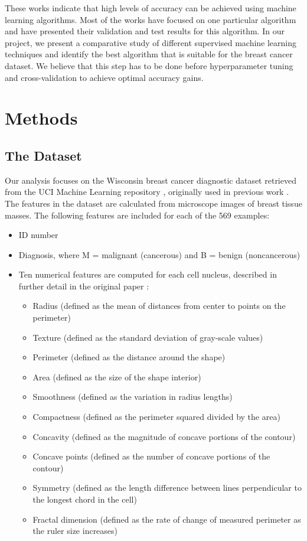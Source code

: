 \documentclass{article}
\begin{document}
These works indicate that high levels of accuracy can be achieved using machine learning algorithms. Most of the works have focused on one particular algorithm and have presented their validation and test results for this algorithm. In our project, we present a comparative study of different supervised machine learning techniques and identify the best algorithm that is suitable for the breast cancer dataset. We believe that this step has to be done before hyperparameter tuning and cross-validation to achieve optimal accuracy gains.

\section{Methods}

\subsection{The Dataset}

Our analysis focuses on the Wisconsin breast cancer diagnostic dataset retrieved from the UCI Machine Learning repository \cite{uci2017}, originally used in previous work \cite{tumour:1993}. The features in the dataset are calculated from microscope images of breast tissue masses. The following features are included for each of the 569 examples:

\begin{itemize}
\item ID number
\item Diagnosis, where M = malignant (cancerous) and B = benign (noncancerous)
\item Ten numerical features are computed for each cell nucleus, described in further detail in the original paper \cite{tumour:1993}:

\begin{itemize}
	\item Radius (defined as the mean of distances from center to points on the perimeter)
	\item Texture (defined as the standard deviation of gray-scale values)
	\item Perimeter (defined as the distance around the shape)
	\item Area (defined as the size of the shape interior)
	\item Smoothness (defined as the variation in radius lengths)
	\item Compactness (defined as the perimeter squared divided by the area)
	\item Concavity (defined as the magnitude of concave portions of the contour)
	\item Concave points (defined as the number of concave portions of the contour)
	\item Symmetry (defined as the length difference between lines perpendicular to the longest chord in the cell)
	\item Fractal dimension (defined as the rate of change of measured perimeter as the ruler size increases)
\end{itemize}

\end{itemize}
\end{document}
